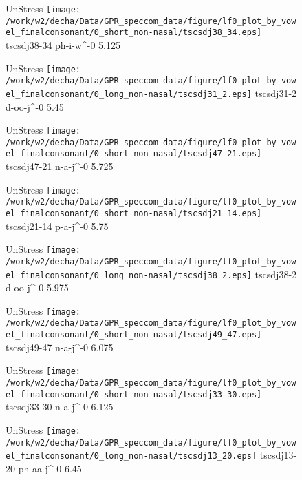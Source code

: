 \documentclass{article}
\begin{document}
\begin{figure}[t]
\begin{minipage}[b]{.24\textwidth}
UnStress
\centering
\texttt{[image: /work/w2/decha/Data/GPR\_speccom\_data/figure/lf0\_plot\_by\_vowel\_finalconsonant/0\_short\_non-nasal/tscsdj38\_34.eps]}
tscsdj38-34 ph-i-w\textasciicircum-0 5.125
\end{minipage}
\begin{minipage}[b]{.24\textwidth}
UnStress
\centering
\texttt{[image: /work/w2/decha/Data/GPR\_speccom\_data/figure/lf0\_plot\_by\_vowel\_finalconsonant/0\_long\_non-nasal/tscsdj31\_2.eps]}
tscsdj31-2 d-oo-j\textasciicircum-0 5.45
\end{minipage}
\begin{minipage}[b]{.24\textwidth}
UnStress
\centering
\texttt{[image: /work/w2/decha/Data/GPR\_speccom\_data/figure/lf0\_plot\_by\_vowel\_finalconsonant/0\_short\_non-nasal/tscsdj47\_21.eps]}
tscsdj47-21 n-a-j\textasciicircum-0 5.725
\end{minipage}
\begin{minipage}[b]{.24\textwidth}
UnStress
\centering
\texttt{[image: /work/w2/decha/Data/GPR\_speccom\_data/figure/lf0\_plot\_by\_vowel\_finalconsonant/0\_short\_non-nasal/tscsdj21\_14.eps]}
tscsdj21-14 p-a-j\textasciicircum-0 5.75
\end{minipage}
\end{figure}

\begin{figure}[t]
\begin{minipage}[b]{.24\textwidth}
UnStress
\centering
\texttt{[image: /work/w2/decha/Data/GPR\_speccom\_data/figure/lf0\_plot\_by\_vowel\_finalconsonant/0\_long\_non-nasal/tscsdj38\_2.eps]}
tscsdj38-2 d-oo-j\textasciicircum-0 5.975
\end{minipage}
\begin{minipage}[b]{.24\textwidth}
UnStress
\centering
\texttt{[image: /work/w2/decha/Data/GPR\_speccom\_data/figure/lf0\_plot\_by\_vowel\_finalconsonant/0\_short\_non-nasal/tscsdj49\_47.eps]}
tscsdj49-47 n-a-j\textasciicircum-0 6.075
\end{minipage}
\begin{minipage}[b]{.24\textwidth}
UnStress
\centering
\texttt{[image: /work/w2/decha/Data/GPR\_speccom\_data/figure/lf0\_plot\_by\_vowel\_finalconsonant/0\_short\_non-nasal/tscsdj33\_30.eps]}
tscsdj33-30 n-a-j\textasciicircum-0 6.125
\end{minipage}
\begin{minipage}[b]{.24\textwidth}
UnStress
\centering
\texttt{[image: /work/w2/decha/Data/GPR\_speccom\_data/figure/lf0\_plot\_by\_vowel\_finalconsonant/0\_long\_non-nasal/tscsdj13\_20.eps]}
tscsdj13-20 ph-aa-j\textasciicircum-0 6.45
\end{minipage}
\end{figure}
\end{document}
